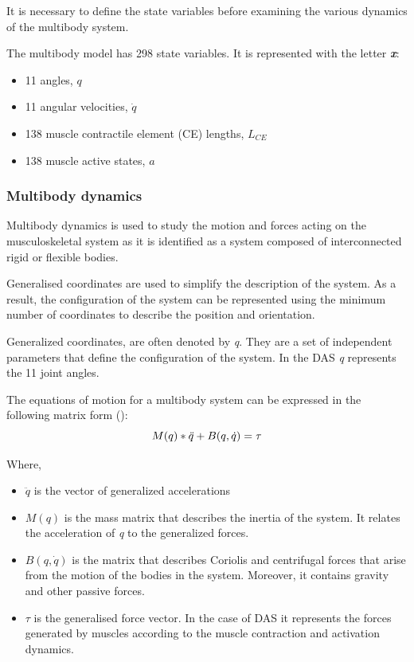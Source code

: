 It is necessary to define the state variables before examining the various dynamics of the multibody system.

The multibody model has 298 state variables. It is represented with the letter\textbf{ \textit{x}}:
\begin{itemize}
    \item 11 angles, $q$
    \item 11 angular velocities, $\dot{q}$
    \item 138 muscle contractile element (CE) lengths, $L_{CE}$
    \item 138 muscle active states, $a$
\end{itemize}

 
\subsubsection{Multibody dynamics}

Multibody dynamics is used to study the motion and forces acting on the musculoskeletal system as it is identified as a system composed of interconnected rigid or flexible bodies. 

Generalised coordinates are used to simplify the description of the system. As a result, the configuration of the system can be represented using the minimum number of coordinates to describe the position and orientation.  

Generalized coordinates, are often denoted by \textit{q}. They are a set of independent parameters that define the configuration of the system. In the DAS \textit{q} represents the 11 joint angles. 

The equations of motion for a multibody system can be expressed in the following matrix form (\cite{Siciliano2009}):
\begin{equation}
    M(q)*\Ddot{q} + B(q,\dot{q}) = \tau
    \label{eq:MBD}
\end{equation}

Where,
\begin{itemize}
    \item $\ddot{q}$ is the vector of generalized accelerations
    \item $M(q)$ is the mass matrix that describes the inertia of the system. It relates the acceleration of \textit{q} to the generalized forces.
    \item $B(q,\dot{q})$ is the matrix that describes Coriolis and centrifugal forces that arise from the motion of the bodies in the system. Moreover, it contains gravity and other passive forces.
    \item $\tau$ is the generalised force vector. In the case of DAS it represents the forces generated by muscles according to the muscle contraction and activation dynamics. 
\end{itemize}

